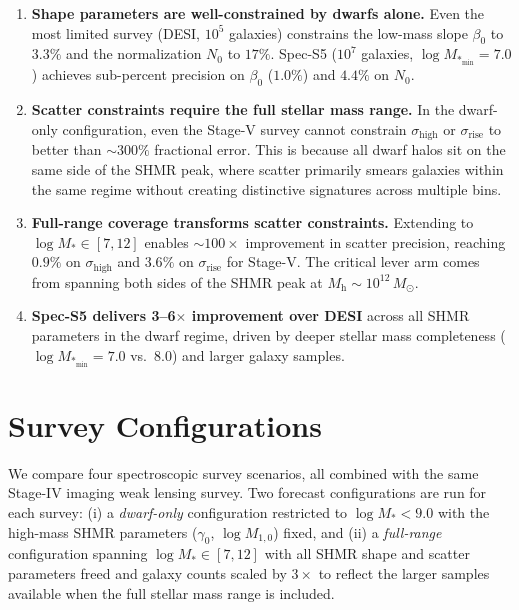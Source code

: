 \documentclass[12pt, letterpaper]{article}
\newcommand{\Msun}{M_\odot}
\newcommand{\Mh}{M_\mathrm{h}}
\newcommand{\Mstar}{M_*}
\begin{document}
\begin{enumerate}
    \item \textbf{Shape parameters are well-constrained by dwarfs
    alone.}
    Even the most limited survey (DESI, $10^5$ galaxies) constrains
    the low-mass slope $\beta_0$ to $3.3\%$ and the normalization
    $N_0$ to $17\%$.
    Spec-S5 ($10^7$ galaxies, $\log\Mstar_\mathrm{min} = 7.0$)
    achieves sub-percent precision on $\beta_0$ ($1.0\%$) and $4.4\%$
    on $N_0$.

    \item \textbf{Scatter constraints require the full stellar mass
    range.}
    In the dwarf-only configuration, even the Stage-V survey cannot
    constrain $\sigma_\mathrm{high}$ or $\sigma_\mathrm{rise}$ to
    better than $\sim\!300\%$ fractional error.
    This is because all dwarf halos sit on the same side of the SHMR
    peak, where scatter primarily smears galaxies within the same
    regime without creating distinctive signatures across multiple
    bins.

    \item \textbf{Full-range coverage transforms scatter constraints.}
    Extending to $\log\Mstar \in [7, 12]$ enables $\sim\!100\times$
    improvement in scatter precision, reaching $0.9\%$ on
    $\sigma_\mathrm{high}$ and $3.6\%$ on $\sigma_\mathrm{rise}$ for
    Stage-V.
    The critical lever arm comes from spanning both sides of the SHMR
    peak at $\Mh \sim 10^{12}\,\Msun$.

    \item \textbf{Spec-S5 delivers 3--6$\times$ improvement over DESI}
    across all SHMR parameters in the dwarf regime, driven by deeper
    stellar mass completeness ($\log\Mstar_\mathrm{min} = 7.0$ vs.\
    $8.0$) and larger galaxy samples.
\end{enumerate}


\section{Survey Configurations}
\label{sec:surveys}

We compare four spectroscopic survey scenarios, all combined with the
same Stage-IV imaging weak lensing survey.
Two forecast configurations are run for each survey:
(i) a \emph{dwarf-only} configuration restricted to
$\log\Mstar < 9.0$ with the high-mass SHMR parameters
($\gamma_0$, $\log M_{1,0}$) fixed, and
(ii) a \emph{full-range} configuration spanning $\log\Mstar \in [7, 12]$
with all SHMR shape and scatter parameters freed and galaxy counts
scaled by $3\times$ to reflect the larger samples available when the
full stellar mass range is included.
\end{document}
